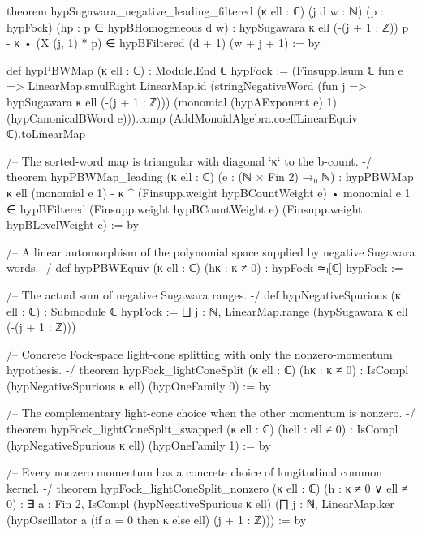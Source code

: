 \begin{leancode}
theorem hypSugawara_negative_leading_filtered (κ ell : ℂ) (j d w : ℕ)
    (p : hypFock) (hp : p ∈ hypBHomogeneous d w) :
    hypSugawara κ ell (-(j + 1 : ℤ)) p - κ • (X (j, 1) * p) ∈
      hypBFiltered (d + 1) (w + j + 1) := by

def hypPBWMap (κ ell : ℂ) : Module.End ℂ hypFock :=
  (Finsupp.lsum ℂ fun e => LinearMap.smulRight LinearMap.id
    (stringNegativeWord (fun j => hypSugawara κ ell (-(j + 1 : ℤ)))
      (monomial (hypAExponent e) 1) (hypCanonicalBWord e))).comp
    (AddMonoidAlgebra.coeffLinearEquiv ℂ).toLinearMap

/-- The sorted-word map is triangular with diagonal `κ` to the b-count. -/
theorem hypPBWMap_leading (κ ell : ℂ) (e : (ℕ × Fin 2) →₀ ℕ) :
    hypPBWMap κ ell (monomial e 1) -
      κ ^ (Finsupp.weight hypBCountWeight e) • monomial e 1 ∈
      hypBFiltered (Finsupp.weight hypBCountWeight e) (Finsupp.weight hypBLevelWeight e) := by

/-- A linear automorphism of the polynomial space supplied by negative Sugawara words. -/
def hypPBWEquiv (κ ell : ℂ) (hκ : κ ≠ 0) : hypFock ≃ₗ[ℂ] hypFock :=

/-- The actual sum of negative Sugawara ranges. -/
def hypNegativeSpurious (κ ell : ℂ) : Submodule ℂ hypFock :=
  ⨆ j : ℕ, LinearMap.range (hypSugawara κ ell (-(j + 1 : ℤ)))

/-- Concrete Fock-space light-cone splitting with only the nonzero-momentum hypothesis. -/
theorem hypFock_lightConeSplit (κ ell : ℂ) (hκ : κ ≠ 0) :
    IsCompl (hypNegativeSpurious κ ell) (hypOneFamily 0) := by

/-- The complementary light-cone choice when the other momentum is nonzero. -/
theorem hypFock_lightConeSplit_swapped (κ ell : ℂ) (hell : ell ≠ 0) :
    IsCompl (hypNegativeSpurious κ ell) (hypOneFamily 1) := by

/-- Every nonzero momentum has a concrete choice of longitudinal common kernel. -/
theorem hypFock_lightConeSplit_nonzero (κ ell : ℂ) (h : κ ≠ 0 ∨ ell ≠ 0) :
    ∃ a : Fin 2, IsCompl (hypNegativeSpurious κ ell)
      (⨅ j : ℕ, LinearMap.ker (hypOscillator a (if a = 0 then κ else ell) (j + 1 : ℤ))) := by
\end{leancode}

